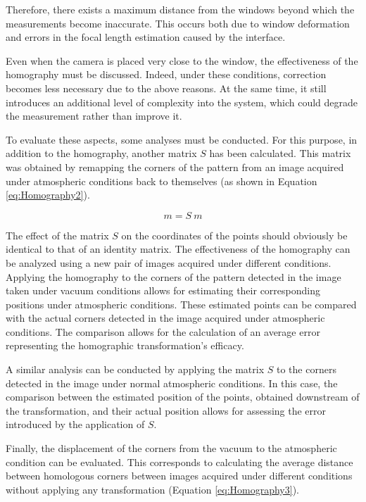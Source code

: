 Therefore, there exists a maximum distance from the windows beyond which the measurements become inaccurate. This occurs both due to window deformation and errors in the focal length estimation caused by the interface.

Even when the camera is placed very close to the window, the effectiveness of the homography must be discussed. Indeed, under these conditions, correction becomes less necessary due to the above reasons. At the same time, it still introduces an additional level of complexity into the system, which could degrade the measurement rather than improve it.

To evaluate these aspects, some analyses must be conducted. For this purpose, in addition to the homography, another matrix $S$ has been calculated. This matrix was obtained by remapping the corners of the pattern from an image acquired under atmospheric conditions back to themselves (as shown in Equation \ref{eq:Homography2}).

\begin{equation}
  \label{eq:Homography2}
  m = S \ m 
\end{equation}

The effect of the matrix $S$ on the coordinates of the points should obviously be identical to that of an identity matrix. The effectiveness of the homography can be analyzed using a new pair of images acquired under different conditions. Applying the homography to the corners of the pattern detected in the image taken under vacuum conditions allows for estimating their corresponding positions under atmospheric conditions. These estimated points can be compared with the actual corners detected in the image acquired under atmospheric conditions. The comparison allows for the calculation of an average error representing the homographic transformation's efficacy.

A similar analysis can be conducted by applying the matrix $S$ to the corners detected in the image under normal atmospheric conditions. In this case, the comparison between the estimated position of the points, obtained downstream of the transformation, and their actual position allows for assessing the error introduced by the application of $S$.

Finally, the displacement of the corners from the vacuum to the atmospheric condition can be evaluated. This corresponds to calculating the average distance between homologous corners between images acquired under different conditions without applying any transformation (Equation \ref{eq:Homography3}).

